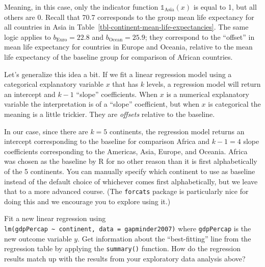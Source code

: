 \documentclass[
  letterpaper,
  DIV=11,
  numbers=noendperiod]{scrreprt}
\theoremstyle{definition}
\theoremstyle{remark}
\begin{document}
Meaning, in this case, only the indicator function
\(\mathbb{1}_{\mbox{Asia}}(x)\) is equal to 1, but all others are 0.
Recall that 70.7 corresponds to the group mean life expectancy for all
countries in Asia in Table~\ref{tbl-continent-mean-life-expectancies}.
The same logic applies to \(b_{\text{Euro}} = 22.8\) and
\(b_{\text{Ocean}} = 25.9\); they correspond to the ``offset'' in mean
life expectancy for countries in Europe and Oceania, relative to the
mean life expectancy of the baseline group for comparison of African
countries.

Let's generalize this idea a bit. If we fit a linear regression model
using a categorical explanatory variable \(x\) that has \(k\) levels, a
regression model will return an intercept and \(k - 1\) ``slope''
coefficients. When \(x\) is a numerical explanatory variable the
interpretation is of a ``slope'' coefficient, but when \(x\) is
categorical the meaning is a little trickier. They are \emph{offsets}
relative to the baseline.

In our case, since there are \(k = 5\) continents, the regression model
returns an intercept corresponding to the baseline for comparison Africa
and \(k - 1 = 4\) slope coefficients corresponding to the Americas,
Asia, Europe, and Oceania. Africa was chosen as the baseline by R for no
other reason than it is first alphabetically of the 5 continents. You
can manually specify which continent to use as baseline instead of the
default choice of whichever comes first alphabetically, but we leave
that to a more advanced course. (The \texttt{forcats} package is
particularly nice for doing this and we encourage you to explore using
it.)

\begin{tcolorbox}[enhanced jigsaw, colback=white, toprule=.15mm, bottomrule=.15mm, titlerule=0mm, title={{🎯} Learning Check 5.4}, leftrule=.75mm, arc=.35mm, left=2mm, colframe=quarto-callout-tip-color-frame, coltitle=black, opacitybacktitle=0.6, bottomtitle=1mm, colbacktitle=quarto-callout-tip-color!10!white, opacityback=0, toptitle=1mm, rightrule=.15mm, breakable]

Fit a new linear regression using
\texttt{lm(gdpPercap\ \textasciitilde{}\ continent,\ data\ =\ gapminder2007)}
where \texttt{gdpPercap} is the new outcome variable \(y\). Get
information about the ``best-fitting'' line from the regression table by
applying the \texttt{summary()} function. How do the regression results
match up with the results from your exploratory data analysis above?

\end{tcolorbox}
\end{document}
